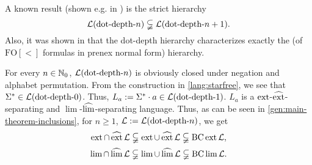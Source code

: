 A known result (shown e.g. in \cite{ConcatGameDotDepth}) is the strict hierarchy
\[ \mathcal{L}(\textup{\textrm{dot-depth-$n$}}) \subsetneqq \mathcal{L}(\textup{\textrm{dot-depth-$n+1$}}). \]
Also, it was shown in \cite{RegEvTho82} that the dot-depth hierarchy characterizes exactly the  (of $\mathrm{FO[<]}$ formulas in prenex normal form) hierarchy.

For every $n\in\mathbb{N}_0$, $\mathcal{L}(\textup{\textrm{dot-depth-$n$}})$ is obviously closed under negation and alphabet permutation. From the construction in \cref{lang:starfree}, we see that $\Sigma^* \in \mathcal{L}(\textup{\textrm{dot-depth-$0$}})$. Thus, $L_a := \Sigma^* \cdot a \in \mathcal{L}(\textup{\textrm{dot-depth-$1$}})$. $L_a$ is a $\operatorname{ext}$-$\operatorname{\widehat{ext}}$-separating and $\lim$-$\operatorname{\widehat{lim}}$-separating language. Thus, as can be seen in \cref{gen:main-theorem-inclusions}, for $n \ge 1$, $\mathcal{L} := \mathcal{L}(\textup{\textrm{dot-depth-$n$}})$, we get
\[ \operatorname{ext} \cap \operatorname{\widehat{ext}} \mathcal{L} \subsetneqq
\operatorname{ext} \cup \operatorname{\widehat{ext}} \mathcal{L} \subsetneqq
\operatorname{BC} \operatorname{ext} \mathcal{L} , \]
\[ \lim \cap \operatorname{\widehat{lim}} \mathcal{L} \subsetneqq
\lim \cup \operatorname{\widehat{lim}} \mathcal{L} \subsetneqq
\operatorname{BC} \lim \mathcal{L} . \]

